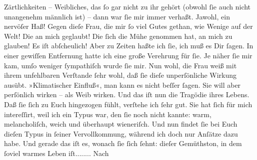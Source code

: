 \begin{ledgroupsized}[t]{13cm}
{{{                  Zärtlichkeiten}}}\label{K_L02735-2h} – Weibliches, das ſo gar nicht zu ihr gehört (obwohl ſie
               auch nicht unangenehm männlich ist) – dann war ſie 
               mir immer verhaßt. Jawohl, ein nervöſer Haß! Gegen dieſe Frau, die mir ſo viel Gutes gethan, wie
               Wenige auf  der Welt! Die an mich geglaubt! Die ſich
               die Mühe genommen hat, an {\pb}mich zu glauben! Es iſt
               abſcheulich! Aber zu Zeiten haßte ich ſie, ich muß es Dir ſagen. In einer gewiſſen
               Entfernung  hatte ich eine große Verehrung für
               ſie. Je näher ſie mir kam, umſo weniger ſympathiſch wurde ſie mir.\pend
           \pstart
           Nun wohl, die Frau weiß mit
               ihrem unfehlbaren Verſtande ſehr wohl, daß ſie dieſe unperſönliche Wirkung ausübt.
               »Klimatischer {\pb}Einfluß«, man kann es nicht beſſer
               ſagen. Sie will aber
               perſönlich wirken – als Weib wirken. Und das iſt nun die Tragödie ihres Lebens.\pend
           \pstart
           Daß ſie ſich zu Euch
               hingezogen fühlt, verſtehe ich ſehr gut. Sie hat ſich für mich intereſſirt, weil ich
               ein Typus war, den ſie noch nicht kannte: warm, melancholiſch, weich und  überhaupt wieneriſch. Und nun findet ſie
               bei Euch dieſen {\pb} Typus in ſeiner Vervollkommung, während ich doch
               nur Anſätze dazu habe. Und gerade das iſt es, wonach ſie ſich ſehnt: dieſer Gemüthston, in dem
               ſoviel warmes Leben iſt........\pend
           \pstart
           Nach \label{K_L02735-3v}
\end{ledgroupsized}
